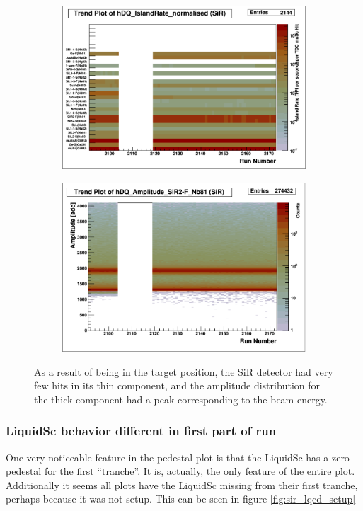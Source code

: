 \documentclass[a4paper]{article}
\begin{document}
\begin{figure}
  \centering
  \begin{subfigure}{0.5\textwidth}
    \includegraphics[width=0.9\linewidth]{figs/sir/rates}
  \end{subfigure}%
  \begin{subfigure}{0.5\textwidth}
    \includegraphics[width=0.9\linewidth]{figs/sir/sir_amp}
  \end{subfigure}
  \caption{As a result of being in the target position, the SiR detector had very few hits in
    its thin component, and the amplitude distribution for the thick component had a peak
    corresponding to the beam energy.}
  \label{fig:sir_inbeam}
\end{figure}


\subsubsection{LiquidSc behavior different in first part of run}
\label{sec:lqsc_setup}
One very noticeable feature in the pedestal plot is that the LiquidSc has a zero pedestal for the first ``tranche''. It is, actually, the only feature of the entire plot.
Additionally it seems all plots have the LiquidSc missing from their first tranche, perhaps because it was not setup.
This can be seen in figure \ref{fig:sir_lqcd_setup}
\end{document}
